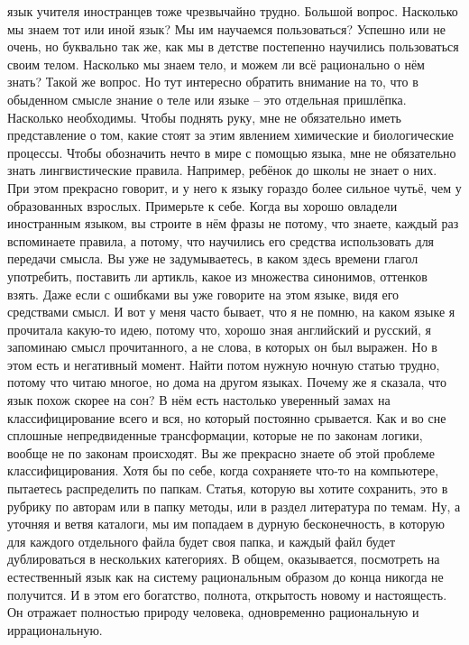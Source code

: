 язык учителя иностранцев тоже чрезвычайно трудно. Большой вопрос. Насколько мы
знаем тот или иной язык? Мы им научаемся пользоваться? Успешно или не очень, но
буквально так же, как мы в детстве постепенно научились пользоваться своим
телом. Насколько мы знаем тело, и можем ли всё рационально о нём знать? Такой же
вопрос. Но тут интересно обратить внимание на то, что в обыденном смысле знание
о теле или языке – это отдельная пришлёпка. Насколько необходимы. Чтобы поднять
руку, мне не обязательно иметь представление о том, какие стоят за этим явлением
химические и биологические процессы. Чтобы обозначить нечто в мире с помощью
языка, мне не обязательно знать лингвистические правила. Например, ребёнок до
школы не знает о них. При этом прекрасно говорит, и у него к языку гораздо более
сильное чутьё, чем у образованных взрослых. Примерьте к себе. Когда вы хорошо
овладели иностранным языком, вы строите в нём фразы не потому, что знаете,
каждый раз вспоминаете правила, а потому, что научились его средства
использовать для передачи смысла. Вы уже не задумываетесь, в каком здесь времени
глагол употребить, поставить ли артикль, какое из множества синонимов, оттенков
взять. Даже если с ошибками вы уже говорите на этом языке, видя его средствами
смысл. И вот у меня часто бывает, что я не помню, на каком языке я прочитала
какую-то идею, потому что, хорошо зная английский и русский, я запоминаю смысл
прочитанного, а не слова, в которых он был выражен. Но в этом есть и негативный
момент. Найти потом нужную ночную статью трудно, потому что читаю многое, но
дома на другом языках. Почему же я сказала, что язык похож скорее на сон? В нём
есть настолько уверенный замах на классифицирование всего и вся, но который
постоянно срывается. Как и во сне сплошные непредвиденные трансформации, которые
не по законам логики, вообще не по законам происходят. Вы же прекрасно знаете об
этой проблеме классифицирования. Хотя бы по себе, когда сохраняете что-то на
компьютере, пытаетесь распределить по папкам. Статья, которую вы хотите
сохранить, это в рубрику по авторам или в папку методы, или в раздел литература
по темам. Ну, а уточняя и ветвя каталоги, мы им попадаем в дурную бесконечность,
в которую для каждого отдельного файла будет своя папка, и каждый файл будет
дублироваться в нескольких категориях. В общем, оказывается, посмотреть на
естественный язык как на систему рациональным образом до конца никогда не
получится. И в этом его богатство, полнота, открытость новому и настоящесть. Он
отражает полностью природу человека, одновременно рациональную и иррациональную.

